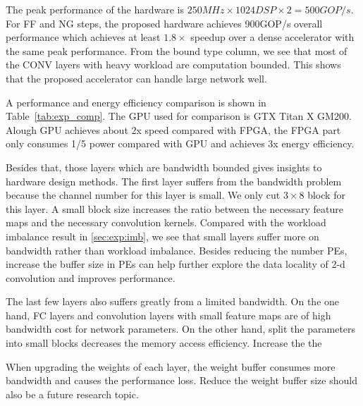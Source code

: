 



The peak performance of the hardware is $250MHz \times 1024DSP \times 2 = 500GOP/s$. For FF and NG steps, the proposed hardware achieves 900GOP/s overall performance which achieves at least $1.8\times$ speedup over a dense accelerator with the same peak performance. From the bound type column, we see that most of the CONV layers with heavy workload are computation bounded. This shows that the proposed accelerator can handle large network well.

A performance and energy efficiency comparison is shown in Table~\ref{tab:exp_comp}. The GPU used for comparison is GTX Titan X GM200. Alough GPU achieves about 2x speed compared with FPGA, the FPGA part only consumes 1/5 power compared with GPU and achieves 3x energy efficiency.

Besides that, those layers which are bandwidth bounded gives insights to hardware design methods. The first layer suffers from the bandwidth problem because the channel number for this layer is small. We only cut $3\times 8$ block for this layer. A small block size increases the ratio between the necessary feature maps and the necessary convolution kernels. Compared with the workload imbalance result in \ref{sec:exp:imb}, we see that small layers suffer more on bandwidth rather than workload imbalance. Besides reducing the number PEs, increase the buffer size in PEs can help further explore the data locality of 2-d convolution and improves performance. 

The last few layers also suffers greatly from a limited bandwidth. On the one hand, FC layers and convolution layers with small feature maps are of high bandwidth cost for network parameters. On the other hand, split the parameters into small blocks decreases the memory access efficiency. Increase the the 

When upgrading the weights of each layer, the weight buffer consumes more bandwidth and causes the performance loss. Reduce the weight buffer size should also be a future research topic. 





